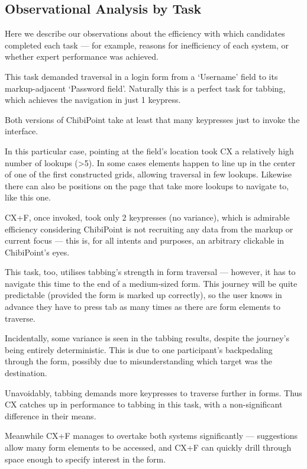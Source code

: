 \documentclass[11pt,openright,a4paper]{report}
\begin{document}
%
%
%
%
%

\subsection{Observational Analysis by Task}
\label{sec:efficiencydiscussion}
Here we describe our observations about the efficiency with which candidates completed each task --- for example, reasons for inefficiency of each system, or whether expert performance was achieved.

\setcounter{TaskType}{0}
This task demanded traversal in a login form from a `Username' field to its markup-adjacent `Password field'. Naturally this is a perfect task for tabbing, which achieves the navigation in just 1 keypress.

Both versions of ChibiPoint take at least that many keypresses just to invoke the interface.

In this particular case, pointing at the field's location took CX a relatively high number of lookups (>5). In some cases elements happen to line up in the center of one of the first constructed grids, allowing traversal in few lookups. Likewise there can also be positions on the page that take more lookups to navigate to, like this one. 

CX+F, once invoked, took only 2 keypresses (no variance), which is admirable efficiency considering ChibiPoint is not recruiting any data from the markup or current focus --- this is, for all intents and purposes, an arbitrary clickable in ChibiPoint's eyes.

This task, too, utilises tabbing's strength in form traversal --- however, it has to navigate this time to the end of a medium-sized form. This journey will be quite predictable (provided the form is marked up correctly), so the user knows in advance they have to press tab as many times as there are form elements to traverse.

Incidentally, some variance is seen in the tabbing results, despite the journey's being entirely deterministic. This is due to one participant's backpedaling through the form, possibly due to misunderstanding which target was the destination.

Unavoidably, tabbing demands more keypresses to traverse further in forms. Thus CX catches up in performance to tabbing in this task, with a non-significant difference in their means.

Meanwhile CX+F manages to overtake both systems significantly --- suggestions allow many form elements to be accessed, and CX+F can quickly drill through space enough to specify interest in the form.
\end{document}
